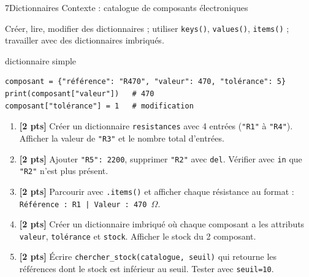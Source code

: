 \documentclass[10pt,a4paper]{article}
\begin{document}
\clearpage
\begin{tptitre}{7}{Dictionnaires}
  Contexte : catalogue de composants électroniques
\end{tptitre}

\begin{objectifbox}
  Créer, lire, modifier des dictionnaires ; utiliser \texttt{keys()}, \texttt{values()}, \texttt{items()} ; travailler avec des dictionnaires imbriqués.
\end{objectifbox}

\begin{codebox}{dictionnaire simple}
\begin{lstlisting}
composant = {"référence": "R470", "valeur": 470, "tolérance": 5}
print(composant["valeur"])   # 470
composant["tolérance"] = 1   # modification
\end{lstlisting}
\end{codebox}

\begin{enumerate}[leftmargin=*, label=\textbf{Q\arabic*.}]
  \item \textbf{[2 pts]} Créer un dictionnaire \texttt{resistances} avec 4 entrées (\texttt{"R1"} à \texttt{"R4"}). Afficher la valeur de \texttt{"R3"} et le nombre total d'entrées.
  \item \textbf{[2 pts]} Ajouter \texttt{"R5": 2200}, supprimer \texttt{"R2"} avec \texttt{del}. Vérifier avec \texttt{in} que \texttt{"R2"} n'est plus présent.
  \item \textbf{[2 pts]} Parcourir avec \texttt{.items()} et afficher chaque résistance au format : \texttt{Référence : R1 | Valeur : 470 $\Omega$}.
  \item \textbf{[2 pts]} Créer un dictionnaire imbriqué où chaque composant a les attributs \texttt{valeur}, \texttt{tolérance} et \texttt{stock}. Afficher le stock du 2\ieme{} composant.
  \item \textbf{[2 pts]} Écrire \texttt{chercher\_stock(catalogue, seuil)} qui retourne les références dont le stock est inférieur au seuil. Tester avec \texttt{seuil=10}.
\end{enumerate}
\end{document}

